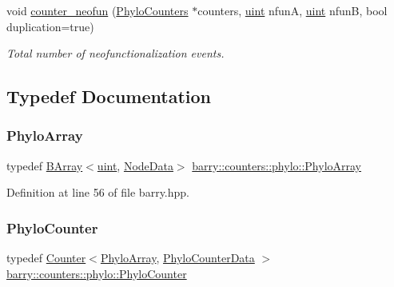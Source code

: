 \begin{Indent}
\begin{DoxyCompactItemize}
void \hyperlink{namespacebarry_1_1counters_1_1phylo_a4cf48d44538ec0646783e29e89027838}{counter\+\_\+neofun} (\hyperlink{namespacebarry_1_1counters_1_1phylo_a4e401ffe66d04091343dcffaf915f8c3}{Phylo\+Counters} $\ast$counters, \hyperlink{namespacebarry_a11dfc53ddb4672278319aa04f1e09a6c}{uint} nfunA, \hyperlink{namespacebarry_a11dfc53ddb4672278319aa04f1e09a6c}{uint} nfunB, bool duplication=true)
\begin{DoxyCompactList}\small\item\em Total number of neofunctionalization events. \end{DoxyCompactList}\end{DoxyCompactItemize}
\end{Indent}


\subsection{Typedef Documentation}
\mbox{\label{namespacebarry_1_1counters_1_1phylo_abd293bf65e494e903639fb5fb2c91604}} 
\subsubsection{\texorpdfstring{Phylo\+Array}{PhyloArray}}
{\footnotesize\ttfamily typedef \hyperlink{classbarry_1_1_b_array}{B\+Array}$<$\hyperlink{namespacebarry_a11dfc53ddb4672278319aa04f1e09a6c}{uint}, \hyperlink{classbarry_1_1counters_1_1phylo_1_1_node_data}{Node\+Data}$>$ \hyperlink{namespacebarry_1_1counters_1_1phylo_abd293bf65e494e903639fb5fb2c91604}{barry\+::counters\+::phylo\+::\+Phylo\+Array}}



Definition at line 56 of file barry.\+hpp.

\mbox{\label{namespacebarry_1_1counters_1_1phylo_a6523924ce3465c5b212584c57664f953}} 
\subsubsection{\texorpdfstring{Phylo\+Counter}{PhyloCounter}}
{\footnotesize\ttfamily typedef \hyperlink{classbarry_1_1_counter}{Counter}$<$\hyperlink{namespacebarry_1_1counters_1_1phylo_abd293bf65e494e903639fb5fb2c91604}{Phylo\+Array}, \hyperlink{namespacebarry_1_1counters_1_1phylo_a6ecc0d8ab76f8dc2db152221a8e9e95a}{Phylo\+Counter\+Data} $>$ \hyperlink{namespacebarry_1_1counters_1_1phylo_a6523924ce3465c5b212584c57664f953}{barry\+::counters\+::phylo\+::\+Phylo\+Counter}}



